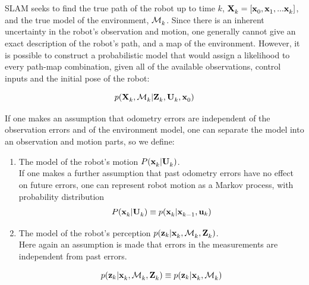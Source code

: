 
SLAM seeks to find the true path of the robot up to time $k$,
$\Xall{k}{}{} = [\x{0}{}{}, \x{1}{}{}, ... \x{k}{}{}]$, and the true
model of the environment, $\map{k}{}{}$. Since there is an inherent
uncertainty in the robot's observation and motion, one generally
cannot give an exact description of the robot's path, and a map of the
environment. However, it is possible to construct a probabilistic
model that would assign a likelihood to every path-map combination,
given all of the available observations, control inputs and the
initial pose of the robot:

\begin{equation}
 p(\Xall{k}{}{}, \map{k}{}{} | \Zall{k}{}, \Uall{k}{}, \x{0}{}{})
\label{eqn:map}
\end{equation}

If one makes an assumption that odometry errors are independent of the
observation errors and of the environment model, one can separate the
model into an observation and motion parts, so we define:

\begin{enumerate}

\item The model of the robot's motion $P(\x{k}{}{} | \Uall{k}{})$. \\
If one makes a further assumption that past odometry errors have no
effect on future errors, one can represent robot motion as a Markov
process, with probability distribution 
\begin{equation}
 P(\x{k}{}{} | \Uall{k}{}) \equiv p(\x{k}{}{}| \x{k-1}{}{}, \U{k})
\end{equation}


\item The model of the robot's perception
$p(\z{k}| \x{k}{}{},\map{k}{}{}, \Zall{k}{})$.\\
Here again an assumption is made that errors in the measurements are
independent from past errors.


\begin{equation}
p(\z{k}| \x{k}{}{},\map{k}{}{}, \Zall{k}{}) \equiv 
  p(\z{k}| \x{k}{}{},\map{k}{}{})
\end{equation}


\end{enumerate}

